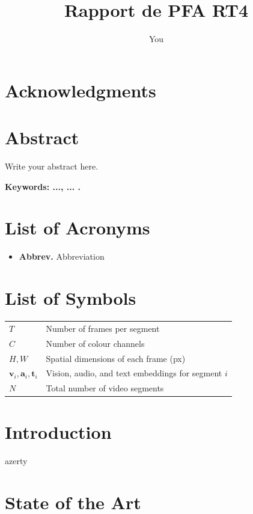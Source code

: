 \documentclass[12pt,a4paper,oneside,english]{book}
\author{You}
\title{Rapport de PFA RT4}
\begin{document}

\chapter*{Acknowledgments}

\frontmatter
\chapter*{Abstract}
\normalsize{Write your abstract here}.

\medskip
{\noindent \textbf{Keywords: ..., ... .} }

\tableofcontents{}
\newpage 
\listoffigures
\newpage 
\listoftables
\newpage
{}
\chapter*{List of Acronyms}
\begin{itemize}
\item \textbf{Abbrev.} Abbreviation
\end{itemize}

\chapter*{List of Symbols}
\begin{tabular}{ll}
$T$   & Number of frames per segment \\
$C$   & Number of colour channels    \\
$H, W$ & Spatial dimensions of each frame (px) \\
$\mathbf{v}_i, \mathbf{a}_i, \mathbf{t}_i$ & Vision, audio, and text embeddings for segment $i$ \\
$N$   & Total number of video segments \\
\end{tabular}


\mainmatter
\chapter*{Introduction}
azerty



\mainmatter
\chapter{State of the Art}
\label{ch:state_of_the_art}
\end{document}
